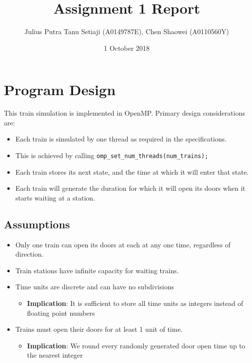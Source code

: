 \documentclass[a4paper,12pt]{article}
\title{Assignment 1 Report}
\author{Julius Putra Tanu Setiaji (A0149787E), Chen Shaowei (A0110560Y)}
\date{1 October 2018}
\begin{document}
\maketitle

\section{Program Design}
This train simulation is implemented in OpenMP. Primary design considerations are:
\begin{itemize}
	\item Each train is simulated by one thread as required in the specifications.
	\item This is achieved by calling \texttt{omp_set_num_threads(num_trains);}
	\item Each train stores its next state, and the time at which it will enter that state.
	\item Each train will generate the duration for which it will open its doors when it starts waiting at a station.
\end{itemize}

\subsection*{Assumptions}

\begin{itemize}
	\item Only one train can open its doors at each at any one time, regardless of direction.
	\item Train stations have infinite capacity for waiting trains.
	\item Time units are discrete and can have no subdivisions
	      \begin{itemize}
		      \item \textbf{Implication}: It is sufficient to store all time units as integers instead of floating point numbers
	      \end{itemize}
	\item Trains must open their doors for at least 1 unit of time.
	      \begin{itemize}
		      \item \textbf{Implication}: We round every randomly generated door open time up to the nearest integer
	      \end{itemize}
\end{itemize}
\end{document}
